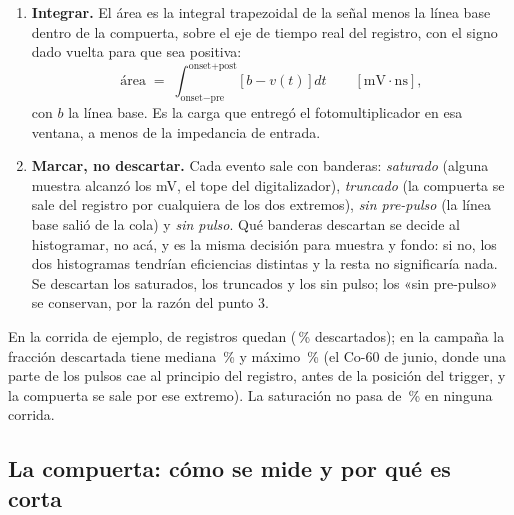 \documentclass[11pt,a4paper]{article}
\begin{document}
\begin{enumerate}
      mide sobre cada archivo (sección~\ref{sec:compuerta}; vale entre
      \PreMin{} y \PreMax{} ns en la campaña) y es zona de línea base, así que
      aporta ruido pero no señal; el \emph{post} es \PostFijo{} ns para todas
      las corridas. Anclar al onset y no a un tiempo fijo del registro es lo
      que hace a la medición inmune al \emph{walk} y al jitter del trigger: la
      ventana viaja con el pulso.
\item \textbf{Integrar.} El área es la integral trapezoidal de la señal menos
      la línea base dentro de la compuerta, sobre el eje de tiempo real del
      registro, con el signo dado vuelta para que sea positiva:
      \[
         \text{área} \;=\; \int_{\text{onset}-\text{pre}}^{\text{onset}+\text{post}}
         \big[\,b - v(t)\,\big]\,dt \qquad [\text{mV}\cdot\text{ns}],
      \]
      con $b$ la línea base. Es la carga que entregó el fotomultiplicador en
      esa ventana, a menos de la impedancia de entrada.
\item \textbf{Marcar, no descartar.} Cada evento sale con banderas:
      \emph{saturado} (alguna muestra alcanzó los \VSatura{} mV, el tope del
      digitalizador), \emph{truncado} (la compuerta se sale del registro por
      cualquiera de los dos extremos), \emph{sin pre-pulso} (la línea base
      salió de la cola) y \emph{sin pulso}. Qué banderas descartan se decide
      al histogramar, no acá, y es la misma decisión para muestra y fondo: si
      no, los dos histogramas tendrían eficiencias distintas y la resta no
      significaría nada. Se descartan los saturados, los truncados y los sin
      pulso; los «sin pre-pulso» se conservan, por la razón del punto 3.
\end{enumerate}

En la corrida de ejemplo, de \EjEventos{} registros quedan \EjBuenos{}
(\EjDescartados\,\% descartados); en la campaña la fracción descartada tiene
mediana \DescartadosMediana\,\% y máximo \DescartadosMax\,\% (el Co-60 de
junio, donde una parte de los pulsos cae al principio del registro, antes de
la posición del trigger, y la compuerta se sale por ese extremo). La saturación no pasa de
\SaturadosMax\,\% en ninguna corrida.

\subsection{La compuerta: cómo se mide y por qué es corta}
\label{sec:compuerta}
\end{document}
